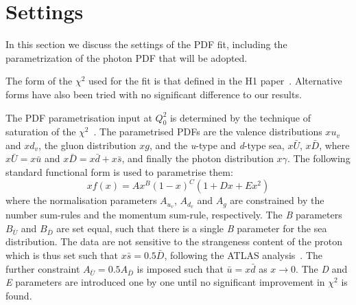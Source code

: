 \section{Settings}
\label{sec:fitsettings}

In this section we discuss the settings of
the PDF fit, including the parametrization of the photon PDF
that will be adopted.

%
The form of the $\chi^2$ used for the fit is that defined in the H1 paper~\cite{h1chisqdef}. 
Alternative forms have also been tried with no significant difference to our results.
 
The PDF parametrisation input at $Q^2_0$ is determined by the technique of saturation of the $\chi^{2}$~\cite{h1chisqsat}.
%
The parametrised PDFs are the valence distributions $xu_{v}$ and $xd_{v}$, the gluon distribution $xg$, and the \textit{u}-type and \textit{d}-type sea, $x\bar{U}$, $x\bar{D}$, where $x\bar{U} = x\bar{u}$ and $x\bar{D} = x\bar{d} + x\bar{s}$, and finally the photon distribution $x\gamma$. The following standard functional form is used to parametrise them:
\begin{equation}
xf(x) = Ax^{B}(1-x)^{C}(1+Dx+Ex^{2})
\end{equation}
where the normalisation parameters $A_{u_{v}}$, $A_{d_{v}}$ and $A_{g}$ are constrained by the number sum-rules and the 
momentum sum-rule, respectively. The \textit{B} parameters $B_{\bar{U}}$ and $B_{\bar{D}}$ are set equal, such that there 
is a single \textit{B} parameter for the sea distribution. The data are not sensitive to the 
strangeness content of the proton which is thus set such that $x\bar{s} = 0.5\bar{D}$, following the ATLAS 
analysis~\cite{Aad:2012sb}. The further constraint $A_{\bar{U}} = 0.5 A_{\bar{D}}$ is imposed such that $\bar{u}=x\bar{d}$ as $x \to 0$.
The \textit{D} and \textit{E} parameters are introduced one by one until no significant 
improvement in $\chi^{2}$ is found. 

